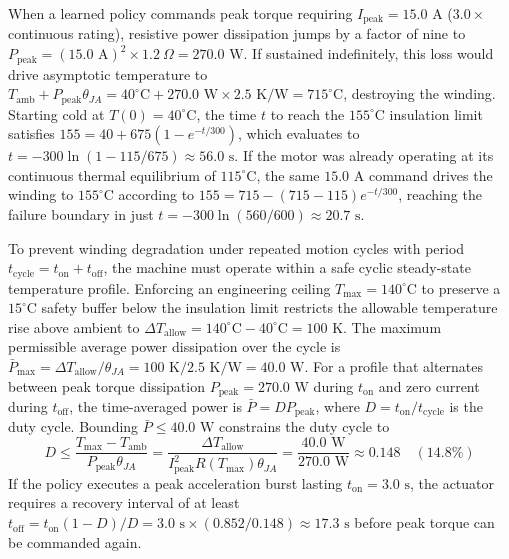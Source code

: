 \documentclass[
  letterpaper,
  DIV=11,
  numbers=noendperiod]{scrartcl}
\begin{document}
When a learned policy commands peak torque requiring
\(I_{\text{peak}} = 15.0\text{ A}\) (\(3.0\times\) continuous rating),
resistive power dissipation jumps by a factor of nine to
\(P_{\text{peak}} = (15.0\text{ A})^2 \times 1.2\ \Omega = 270.0\text{ W}\).
If sustained indefinitely, this loss would drive asymptotic temperature
to
\(T_{\text{amb}} + P_{\text{peak}} \theta_{JA} = 40^\circ\text{C} + 270.0\text{ W} \times 2.5\text{ K/W} = 715^\circ\text{C}\),
destroying the winding. Starting cold at \(T(0) = 40^\circ\text{C}\),
the time \(t\) to reach the \(155^\circ\text{C}\) insulation limit
satisfies \(155 = 40 + 675 (1 - e^{-t / 300})\), which evaluates to
\(t = -300 \ln(1 - 115 / 675) \approx 56.0\text{ s}\). If the motor was
already operating at its continuous thermal equilibrium of
\(115^\circ\text{C}\), the same \(15.0\text{ A}\) command drives the
winding to \(155^\circ\text{C}\) according to
\(155 = 715 - (715 - 115) e^{-t / 300}\), reaching the failure boundary
in just \(t = -300 \ln(560 / 600) \approx 20.7\text{ s}\).

To prevent winding degradation under repeated motion cycles with period
\(t_{\text{cycle}} = t_{\text{on}} + t_{\text{off}}\), the machine must
operate within a safe cyclic steady-state temperature profile. Enforcing
an engineering ceiling \(T_{\text{max}} = 140^\circ\text{C}\) to
preserve a \(15^\circ\text{C}\) safety buffer below the insulation limit
restricts the allowable temperature rise above ambient to
\(\Delta T_{\text{allow}} = 140^\circ\text{C} - 40^\circ\text{C} = 100\text{ K}\).
The maximum permissible average power dissipation over the cycle is
\(\bar{P}_{\text{max}} = \Delta T_{\text{allow}} / \theta_{JA} = 100\text{ K} / 2.5\text{ K/W} = 40.0\text{ W}\).
For a profile that alternates between peak torque dissipation
\(P_{\text{peak}} = 270.0\text{ W}\) during \(t_{\text{on}}\) and zero
current during \(t_{\text{off}}\), the time-averaged power is
\(\bar{P} = D P_{\text{peak}}\), where
\(D = t_{\text{on}} / t_{\text{cycle}}\) is the duty cycle. Bounding
\(\bar{P} \le 40.0\text{ W}\) constrains the duty cycle to
\[D \le \frac{T_{\text{max}} - T_{\text{amb}}}{P_{\text{peak}} \theta_{JA}} = \frac{\Delta T_{\text{allow}}}{I_{\text{peak}}^2 R(T_{\text{max}}) \theta_{JA}} = \frac{40.0\text{ W}}{270.0\text{ W}} \approx 0.148 \quad (14.8\%)\]
If the policy executes a peak acceleration burst lasting
\(t_{\text{on}} = 3.0\text{ s}\), the actuator requires a recovery
interval of at least
\(t_{\text{off}} = t_{\text{on}}(1 - D) / D = 3.0\text{ s} \times (0.852 / 0.148) \approx 17.3\text{ s}\)
before peak torque can be commanded again.
\end{document}
